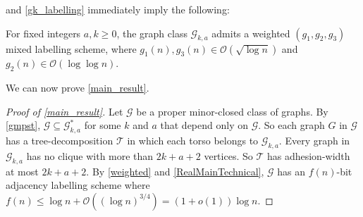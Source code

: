 \documentclass{patmorin}
\renewcommand{\ge}{\geqslant}
\renewcommand{\le}{\leqslant}
\newcommand{\Oh}{\calO}
\newcommand{\calG}{\mathcal{G}}
\newcommand{\calO}{\mathcal{O}}
\newcommand{\calT}{\mathcal{T}}
\begin{document}
   and \cref{gk_labelling} immediately imply the following:

  \begin{thm}\label{gak_labelling}\label{weighted}
    For fixed integers $a,k\ge 0$, the graph class $\calG_{k,a}$ admits a weighted $(g_1,g_2,g_3)$ mixed labelling scheme, where $g_1(n),g_3(n)\in \Oh(\sqrt{\log n})$ and $g_2(n)\in \Oh(\log\log n)$.
  \end{thm}

  We can now prove \cref{main_result}.

  \begin{proof}[Proof of \cref{main_result}]
     Let $\calG$ be a proper minor-closed class of graphs.  By \cref{gmpst}, $\calG\subseteq \calG^*_{k,a}$ for some $k$ and $a$ that depend only on $\calG$.  So each graph $G$ in $\calG$ has a tree-decomposition $\calT$ in which each torso belongs to $\calG_{k,a}$. Every graph in $\calG_{k,a}$ has no clique with more than $2k+a+2$ vertices. So $\calT$ has adhesion-width at most $2k+a+2$.    By \cref{weighted} and \cref{RealMainTechnical}, $\calG$ has an $f(n)$-bit adjacency labelling scheme where
     $f(n) \le \log n + \Oh((\log n)^{3/4}) = (1+o(1))\log n$.
  \end{proof}
\end{document}
